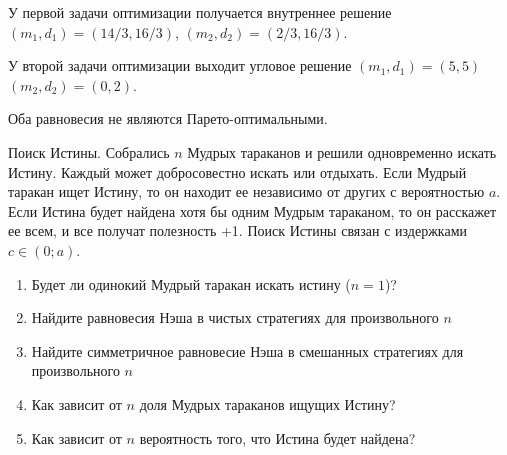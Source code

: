 \begin{solution}
У первой задачи оптимизации получается внутреннее решение $(m_1,d_1)=(14/3,16/3)$, $(m_2,d_2)=(2/3,16/3)$. 

У второй задачи оптимизации выходит угловое решение $(m_1,d_1)=(5,5)$ $(m_2,d_2)=(0,2)$.

Оба равновесия не являются Парето-оптимальными.
\end{solution}


\begin{problem} 
Поиск Истины.
Собрались $n$ Мудрых тараканов и решили одновременно искать Истину. Каждый может добросовестно искать или отдыхать. Если Мудрый таракан ищет Истину, то он находит ее независимо от других с вероятностью $a$. Если Истина будет найдена хотя бы одним Мудрым тараканом, то он расскажет ее всем, и все получат полезность +1. Поиск Истины связан с издержками $c\in(0;a)$. 
\begin{enumerate}
\item Будет ли одинокий Мудрый таракан искать истину ($n=1$)? 
\item Найдите равновесия Нэша в чистых стратегиях для произвольного $n$ 
\item Найдите симметричное равновесие Нэша в смешанных стратегиях для произвольного $n$ 
\item Как зависит от $n$ доля Мудрых тараканов ищущих Истину? 
\item Как зависит от $n$ вероятность того, что Истина будет найдена? 
\end{enumerate}
\end{problem}

